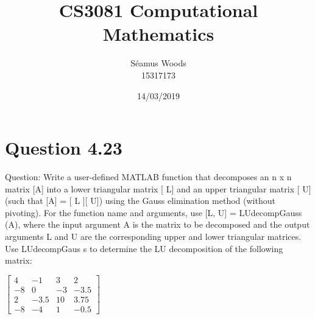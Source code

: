 \documentclass[12pt]{report}
\title{CS3081 Computational Mathematics}
\author{Séamus Woods \\ 15317173}
\date{14/03/2019}
\begin{document}
\maketitle
\newpage

\section{Question 4.23}
Question: Write a user-defined MATLAB function that decomposes an n  x  n matrix [A] into a lower triangular matrix [ L] and  an  upper triangular matrix [ U] (such that [A] = [ L ][  U]) using the  Gauss elimination method (without pivoting). For the  function name and arguments, use [L, U]  = LUdecompGauss (A), where the input argument A is the matrix to be decomposed and the output arguments L and U are the cor­responding upper and lower triangular matrices. Use LUdecompGaus s to determine the LU decomposi­tion of the following matrix:  
\begin{center}
$\begin{bmatrix}
{4} & {-1} & {3} & {2}\\
{-8} & {0} & {-3} & {-3.5}\\
{2} & {-3.5} & {10} & {3.75}\\
{-8} & {-4} & {1} & {-0.5}
\end{bmatrix}$
\end{center}
\end{document}
